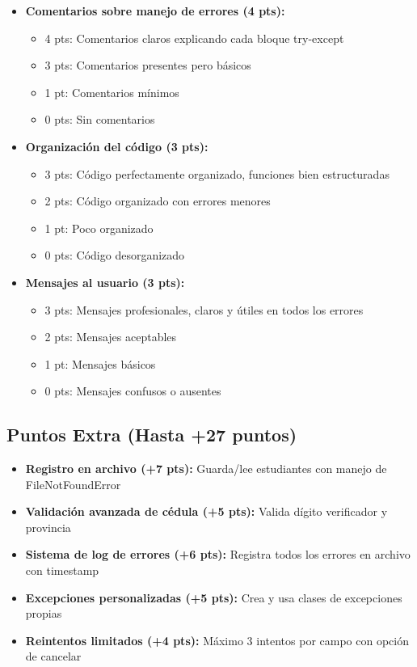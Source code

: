 \documentclass[12pt,a4paper]{article}
\begin{document}
\begin{itemize}[leftmargin=*]
    \item \textbf{Comentarios sobre manejo de errores (4 pts):}
    \begin{itemize}
        \item 4 pts: Comentarios claros explicando cada bloque try-except
        \item 3 pts: Comentarios presentes pero básicos
        \item 1 pt: Comentarios mínimos
        \item 0 pts: Sin comentarios
    \end{itemize}
    
    \item \textbf{Organización del código (3 pts):}
    \begin{itemize}
        \item 3 pts: Código perfectamente organizado, funciones bien estructuradas
        \item 2 pts: Código organizado con errores menores
        \item 1 pt: Poco organizado
        \item 0 pts: Código desorganizado
    \end{itemize}
    
    \item \textbf{Mensajes al usuario (3 pts):}
    \begin{itemize}
        \item 3 pts: Mensajes profesionales, claros y útiles en todos los errores
        \item 2 pts: Mensajes aceptables
        \item 1 pt: Mensajes básicos
        \item 0 pts: Mensajes confusos o ausentes
    \end{itemize}
\end{itemize}

\subsection{Puntos Extra (Hasta +27 puntos)}

\begin{itemize}[leftmargin=*]
    \item \textbf{Registro en archivo (+7 pts):} Guarda/lee estudiantes con manejo de FileNotFoundError
    \item \textbf{Validación avanzada de cédula (+5 pts):} Valida dígito verificador y provincia
    \item \textbf{Sistema de log de errores (+6 pts):} Registra todos los errores en archivo con timestamp
    \item \textbf{Excepciones personalizadas (+5 pts):} Crea y usa clases de excepciones propias
    \item \textbf{Reintentos limitados (+4 pts):} Máximo 3 intentos por campo con opción de cancelar
\end{itemize}
\end{document}
